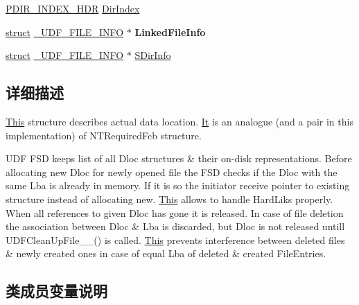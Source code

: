 \begin{DoxyCompactItemize}
\hyperlink{struct___d_i_r___i_n_d_e_x___h_d_r}{P\+D\+I\+R\+\_\+\+I\+N\+D\+E\+X\+\_\+\+H\+DR} \hyperlink{struct___u_d_f___d_a_t_a_l_o_c___i_n_f_o_aefc2ae1a50056dcbd7fa7bae15a1931d}{Dir\+Index}
\item 
\mbox{\label{struct___u_d_f___d_a_t_a_l_o_c___i_n_f_o_af7192926e7598ea7e09b9f2f82d218a3}} 
\hyperlink{interfacestruct}{struct} \hyperlink{struct___u_d_f___f_i_l_e___i_n_f_o}{\+\_\+\+U\+D\+F\+\_\+\+F\+I\+L\+E\+\_\+\+I\+N\+FO} $\ast$ {\bfseries Linked\+File\+Info}
\item 
\hyperlink{interfacestruct}{struct} \hyperlink{struct___u_d_f___f_i_l_e___i_n_f_o}{\+\_\+\+U\+D\+F\+\_\+\+F\+I\+L\+E\+\_\+\+I\+N\+FO} $\ast$ \hyperlink{struct___u_d_f___d_a_t_a_l_o_c___i_n_f_o_a1c3f0b9df859980637a14f92d08350d4}{S\+Dir\+Info}
\end{DoxyCompactItemize}


\subsection{详细描述}
\hyperlink{namespace_this}{This} structure describes actual data location. \hyperlink{class_it}{It} is an analogue (and a pair in this implementation) of N\+T\+Required\+Fcb structure.

U\+DF F\+SD keeps list of all Dloc structures \& their on-\/disk representations. Before allocating new Dloc for newly opened file the F\+SD checks if the Dloc with the same Lba is already in memory. If it is so the initiator receive pointer to existing structure instead of allocating new. \hyperlink{namespace_this}{This} allows to handle Hard\+Liks properly. When all references to given Dloc has gone it is released. In case of file deletion the association between Dloc \& Lba is discarded, but Dloc is not released untill U\+D\+F\+Clean\+Up\+File\+\_\+\+\_\+() is called. \hyperlink{namespace_this}{This} prevents interference between deleted files \& newly created ones in case of equal Lba of deleted \& created File\+Entries. 

\subsection{类成员变量说明}
\mbox{\label{struct___u_d_f___d_a_t_a_l_o_c___i_n_f_o_ade01a853270827c06a39f6b33db3f6a7}} 
